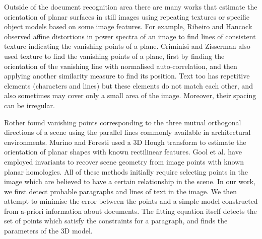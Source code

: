 \documentclass{elsart}   %
\begin{document}
Outside of the document recognition area there are  many works that
estimate the orientation of planar surfaces in still images 
using  repeating textures or specific object models based on some image features.
For example, Ribeiro and Hancock \cite{ribeiro}
observed affine distortions in power spectra of an image to find lines of
consistent texture indicating the vanishing points of a plane. Criminisi and
Zisserman \cite{zisserman} also used texture to find the vanishing points of a
plane,  first by finding the orientation of the vanishing line with normalised
auto-correlation, and then applying another similarity measure to find its position.
Text too has repetitive elements (characters and lines) but
these elements do not match each other, and also sometimes may cover only a
small area of the image. Moreover, their spacing can be irregular.



Rother \cite{rother0} found vanishing points corresponding to the three mutual
orthogonal directions of a scene using the parallel lines commonly available
in architectural environments.  Murino and Foresti \cite{MURIN} used a 3D Hough
transform to estimate the orientation of planar shapes with known rectilinear
features.  Gool et al. \cite{vangool98planar} have employed invariants to
recover scene geometry from image points with known planar homologies.  All of
these methods initially require selecting points in the image which are believed
to have a certain relationship in the scene.  In our work, we first detect
probable paragraphs and lines of text in the image.  We then attempt to minimise
the error between the points and a simple model constructed from a-priori information
about documents.  The fitting equation itself detects the set of points which
satisfy the constraints for a paragraph, and finds the parameters of the 3D
model.
\end{document}
